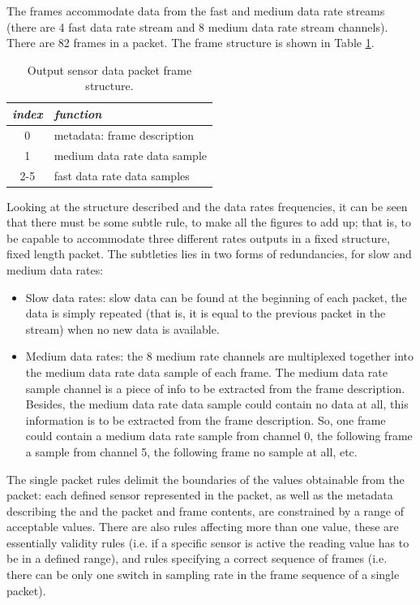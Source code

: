 \documentclass{article} \usepackage{times}
\begin{document}
The frames accommodate data from the fast and medium data rate streams
(there are 4 fast data rate stream and 8 medium data rate stream
channels).  There are 82 frames in a packet.  The frame structure is
shown in Table \ref{tab:frame_structure}.

\begin{table}[htbp]
  \caption{Output sensor data packet frame structure.}
  \label{tab:frame_structure}
  \begin{center}
    \begin{tabular}{|c|l|}\hline
      \textbf{\textit{index}} & \textbf{\textit{function}}\\\hline
      0 & metadata: frame description\\\hline
      1 & medium data rate data sample\\\hline
      2-5 & fast data rate data samples\\\hline
    \end{tabular}
  \end{center}
\end{table}

Looking at the structure described and the data rates frequencies, it
can be seen that there must be some subtle rule, to make all the
figures to add up; that is, to be capable to accommodate three
different rates outputs in a fixed structure, fixed length packet.
The subtleties lies in two forms of redundancies, for slow and medium
data rates:

\begin{itemize}
\item Slow data rates: slow data can be found at the beginning of each
  packet, the data is simply repeated (that is, it is equal to the
  previous packet in the stream) when no new data is available.
\item Medium data rates: the 8 medium rate channels are multiplexed
  together into the medium data rate data sample of each frame.  The
  medium data rate sample channel is a piece of info to be extracted
  from the frame description. Besides, the medium data rate data
  sample could contain no data at all, this information is to be
  extracted from the frame description. So, one frame could contain a
  medium data rate sample from channel 0, the following frame a sample
  from channel 5, the following frame no sample at all, etc.
\end{itemize}

The single packet rules delimit the boundaries of the values
obtainable from the packet: each defined sensor represented in the
packet, as well as the metadata describing the \STSB and the packet
and frame contents, are constrained by a range of acceptable values.
There are also rules affecting more than one value, these are
essentially validity rules (i.e. if a specific sensor is active the
reading value has to be in a defined range), and rules specifying a
correct sequence of frames (i.e. there can be only one switch in
sampling rate in the frame sequence of a single packet).
\end{document}
